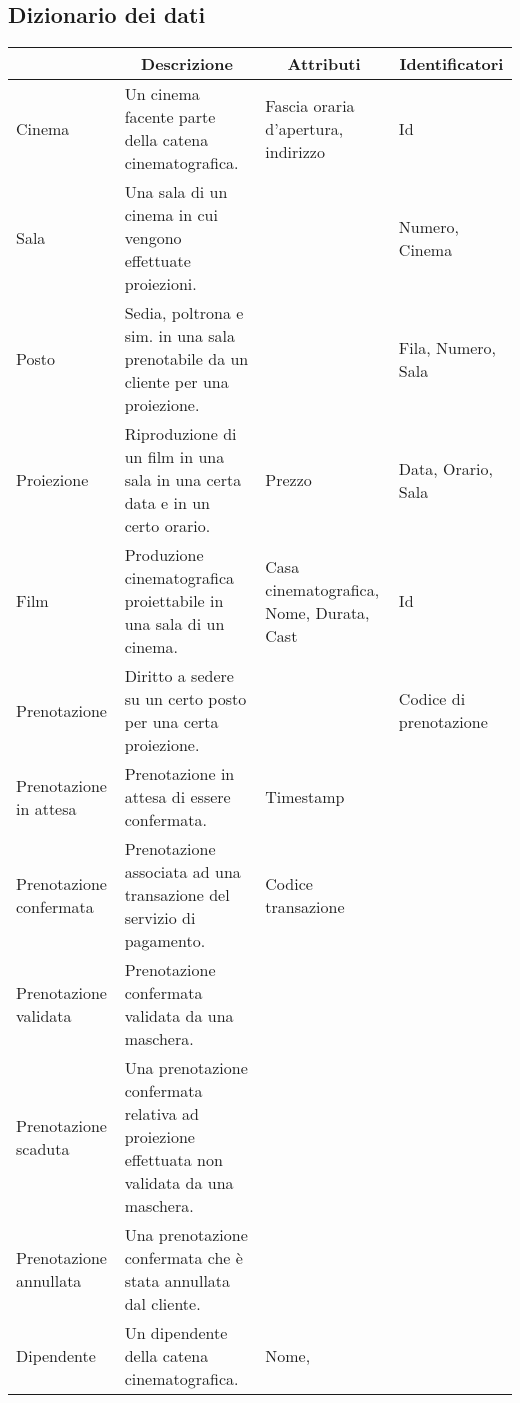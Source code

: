 \subsection*{Dizionario dei dati}
%
%
\begin{longtable}{|p{2.5cm}|p{7.1cm}|p{2.5cm}|p{3.2cm}|}
    \hline
    \rowcolor{tblhdrcolor}
    \multicolumn{1}{|c|}{\textbf{Entità}}
     & \multicolumn{1}{|c|}{\textbf{Descrizione}}
     & \multicolumn{1}{|c|}{\textbf{Attributi}}
     & \multicolumn{1}{|c|}{\textbf{Identificatori}}
    \\ \hline
    Cinema
     & Un cinema facente parte della catena cinematografica.
     & Fascia oraria d'apertura,
    indirizzo
     & Id
    \\\hline
    Sala
     & Una sala di un cinema in cui vengono effettuate proiezioni.
     &
     & Numero, Cinema
    \\\hline
    Posto
     & Sedia, poltrona e sim. in una sala prenotabile da un cliente per
    una proiezione.
     &
     & Fila, Numero, Sala
    \\\hline
    Proiezione
     & Riproduzione di un film in una sala in una certa data e in un
    certo orario.
     & Prezzo
     & Data, Orario, Sala
    \\\hline
    Film
     & Produzione cinematografica proiettabile in una sala di un cinema.
     & Casa cinematografica, Nome, Durata, Cast
     & Id
    \\\hline
    Prenotazione
     & Diritto a sedere su un certo posto per una certa proiezione.
     & 
     & Codice di prenotazione
    \\\hline
    Prenotazione in attesa
     & Prenotazione in attesa di essere confermata.
     & Timestamp
     &
    \\\hline
    Prenotazione confermata
     & Prenotazione associata ad una transazione del servizio di pagamento.
     & Codice transazione
     &
    \\\hline
    Prenotazione validata
     & Prenotazione confermata validata da una maschera.
     &
     &
    \\\hline
    Prenotazione scaduta
     & Una prenotazione confermata relativa ad proiezione effettuata non
    validata da una maschera.
     &
     &
    \\\hline
    Prenotazione annullata
     & Una prenotazione confermata che è stata annullata dal cliente.
     &
     &
    \\\hline
    Dipendente
     & Un dipendente della catena cinematografica.
     & Nome,


\end{longtable}
